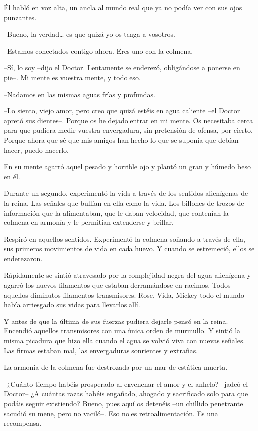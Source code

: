 {Él habló en voz alta, un ancla al mundo real que ya no podía ver con
sus ojos punzantes.}

{--Bueno, la verdad\ldots{} es que quizá yo os tenga a vosotros.}

{--Estamos conectados contigo ahora. Eres uno con la colmena.}

{--Sí, lo soy --dijo el Doctor. Lentamente se enderezó, obligándose a
ponerse en pie--. Mi mente es vuestra mente, y todo eso.}

{--Nadamos en las mismas aguas frías y profundas.}

{--Lo siento, viejo amor, pero creo que quizá estéis en agua caliente
 --el Doctor apretó sus dientes--. Porque os he dejado entrar en mi
 mente. Os necesitaba cerca para que pudiera medir vuestra envergadura,
 sin pretensión de ofensa, por cierto. Porque ahora que sé que mis amigos
han hecho lo que se suponía que debían hacer, puedo hacerlo.}

{En su mente agarró aquel pesado y horrible ojo y plantó un gran y
húmedo beso en él.}

{Durante un segundo, experimentó la vida a través de los sentidos
 alienígenas de la reina. Las señales que bullían en ella como la vida.
 Los billones de trozos de información que la alimentaban, que le daban
 velocidad, que contenían la colmena en armonía y le permitían extenderse
y brillar.}

{Respiró en aquellos sentidos. Experimentó la colmena soñando a través
 de ella, sus primeros movimientos de vida en cada huevo. Y cuando se
estremeció, ellos se enderezaron.}

{Rápidamente se sintió atravesado por la complejidad negra del agua
 alienígena y agarró los nuevos filamentos que estaban derramándose en
 racimos. Todos aquellos diminutos filamentos transmisores. Rose, Vida,
Mickey todo el mundo había arriesgado sus vidas para llevarlos allí.}

{Y antes de que la última de sus fuerzas pudiera dejarle pensó en la
 reina. Encendió aquellos transmisores con una única orden de murmullo. Y
 sintió la misma picadura que hizo ella cuando el agua se volvió viva con
 nuevas señales. Las firmas estaban mal, las envergaduras sonrientes y
extrañas.}

{La armonía de la colmena fue destrozada por un mar de estática muerta.}

{--¿Cuánto tiempo habéis prosperado al envenenar el amor y el anhelo?
 --jadeó el Doctor-- ¿A cuántas razas habéis engañado, ahogado y
 sacrificado solo para que podáis seguir existiendo? Bueno, pues aquí os
 detenéis --un chillido penetrante sacudió su mene, pero no vaciló--. Eso
no es retroalimentación. Es una recompensa.}


